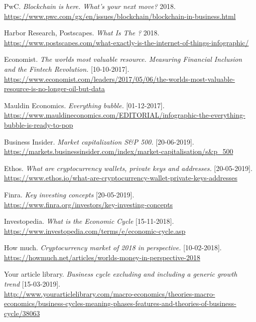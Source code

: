 \begin{thebibliography}{25}
PwC. \emph{Blockchain is here. What's your next move?} 2018.\\
\url{https://www.pwc.com/gx/en/issues/blockchain/blockchain-in-business.html}

Harbor Research, Postscapes. \emph{What Is The ?} 2018.\\
\url{https://www.postscapes.com/what-exactly-is-the-internet-of-things-infographic/}

Economist. \emph{The worlds most valuable resource. Measuring Financial Inclusion and the Fintech Revolution.} [10-10-2017].\\
\url{https://www.economist.com/leaders/2017/05/06/the-worlds-most-valuable-resource-is-no-longer-oil-but-data}

Mauldin Economics. \emph{Everything bubble.} [01-12-2017].\\ \url{https://www.mauldineconomics.com/EDITORIAL/infographic-the-everything-bubble-is-ready-to-pop}

Business Insider. \emph{Market capitalization S\&P 500.} [20-06-2019].\\
\url{https://markets.businessinsider.com/index/market-capitalisation/s&p_500}

Ethos. \emph{What are cryptocurrency wallets, private keys and addresses.} [20-05-2019].\\
\url{https://www.ethos.io/what-are-cryptocurrency-wallet-private-keys-addresses}

Finra. \emph{Key investing concepts} [20-05-2019].\\
\url{https://www.finra.org/investors/key-investing-concepts}

Investopedia. \emph{What is the Economic Cycle} [15-11-2018].\\
\url{https://www.investopedia.com/terms/e/economic-cycle.asp}

How much. \emph{Cryptocurrency market of 2018 in perspective.} [10-02-2018].\\
\url{https://howmuch.net/articles/worlds-money-in-perspective-2018}

Your article library. \emph{Business cycle excluding and including a generic growth trend} [15-03-2019].\\
\url{http://www.yourarticlelibrary.com/macro-economics/theories-macro-economics/business-cycles-meaning-phases-features-and-theories-of-business-cycle/38063}


\end{thebibliography}
